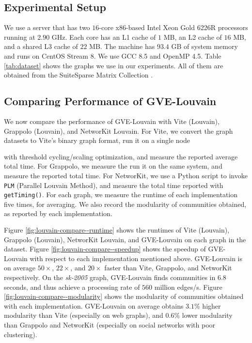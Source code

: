 \subsection{Experimental Setup}
\label{sec:setup}

We use a server that has two $16$-core x86-based Intel Xeon Gold 6226R processors running at $2.90$ GHz. Each core has an L1 cache of $1$ MB, an L2 cache of $16$ MB, and a shared L3 cache of $22$ MB. The machine has $93.4$ GB of system memory and runs on CentOS Stream 8. We use GCC 8.5 and OpenMP 4.5. Table \ref{tab:dataset} shows the graphs we use in our experiments. All of them are obtained from the SuiteSparse Matrix Collection \cite{suite19}.







\subsection{Comparing Performance of GVE-Louvain}
\label{sec:comparison}

We now compare the performance of GVE-Louvain with Vite (Louvain), Grappolo (Louvain), and NetworKit Louvain. For Vite, we convert the graph datasets to Vite's binary graph format, run it on a single node with threshold cycling/scaling optimization, and measure the reported average total time. For Grappolo, we measure the run it on the same system, and measure the reported total time. For NetworKit, we use a Python script to invoke \texttt{PLM} (Parallel Louvain Method), and measure the total time reported with \texttt{getTiming()}. For each graph, we measure the runtime of each implementation five times, for averaging. We also record the modularity of communities obtained, as reported by each implementation.

Figure \ref{fig:louvain-compare--runtime} shows the runtimes of Vite (Louvain), Grappolo (Louvain), NetworKit Louvain, and GVE-Louvain on each graph in the dataset. Figure \ref{fig:louvain-compare--speedup} shows the speedup of GVE-Louvain with respect to each implementation mentioned above. GVE-Louvain is on average $50\times$, $22\times$, and $20\times$ faster than Vite, Grappolo, and NetworKit respectively. On the \textit{sk-2005} graph, GVE-Louvain finds communities in $6.8$ seconds, and thus achieve a processing rate of $560$ million edges/s. Figure \ref{fig:louvain-compare--modularity} shows the modularity of communities obtained with each implementation. GVE-Louvain on average obtains $3.1\%$ higher modularity than Vite (especially on web graphs), and $0.6\%$ lower modularity than Grappolo and NetworKit (especially on social networks with poor clustering).

